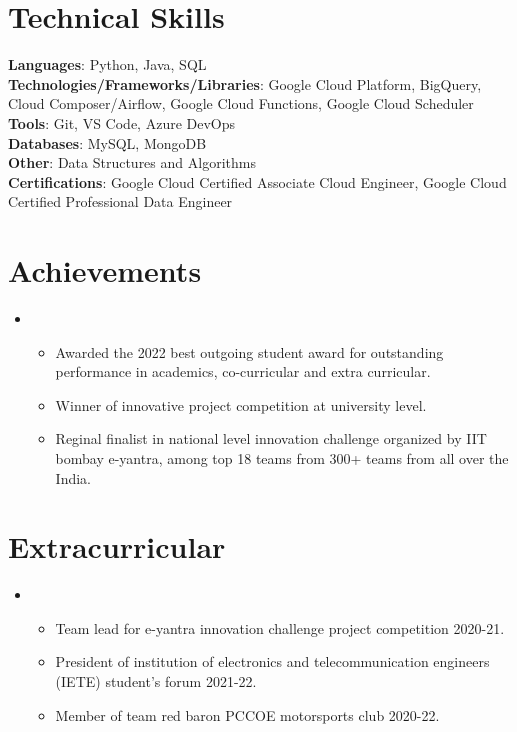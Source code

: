 \documentclass[letterpaper,11pt]{article}
\newcommand{\resumeItem}[1]{
  \item\small{
	{#1 \vspace{-2pt}}
  }
}
\newcommand{\resumeItemListStart}{\begin{itemize}}
\newcommand{\resumeItemListEnd}{\end{itemize}\vspace{-5pt}}
\begin{document}
\section{Technical Skills}
 \begin{itemize}[leftmargin=0.15in, label={}]
	\small{\item{
 	\textbf{Languages}{: Python, Java, SQL } \\
 	\textbf{Technologies/Frameworks/Libraries}{: Google Cloud Platform, BigQuery, Cloud Composer/Airflow, Google Cloud Functions, Google Cloud Scheduler } \\
 	\textbf{Tools}{: Git, VS Code, Azure DevOps } \\
 	\textbf{Databases}{: MySQL, MongoDB } \\
 	\textbf{Other}{: Data Structures and Algorithms } \\
  \textbf{Certifications}{: Google Cloud Certified Associate Cloud Engineer, Google Cloud Certified Professional Data Engineer} \\
	}}
 \end{itemize}
 \vspace{-16pt}


%
\section{Achievements}
\vspace{2pt}
 \begin{itemize}[leftmargin=0.15in, label={}]
 \item
	\resumeItemListStart
    	\resumeItem{Awarded the 2022 best outgoing student award for outstanding performance in academics, co-curricular and extra curricular.}
    	\resumeItem{Winner of innovative project competition at university level. }
    	\resumeItem{Reginal finalist in national level innovation challenge organized by IIT bombay e-yantra, among top 18 teams from 300+ teams from all over the India. }
  	\resumeItemListEnd
 \end{itemize}
 \vspace{-16pt}


%
\section{Extracurricular}
\vspace{2pt}
 \begin{itemize}[leftmargin=0.15in, label={}]
 \item
	\resumeItemListStart
    	\resumeItem {Team lead for e-yantra innovation challenge project competition 2020-21.}
    	\resumeItem {President of institution of electronics and telecommunication engineers (IETE) student's forum 2021-22.}
    	\resumeItem {Member of team red baron PCCOE motorsports club 2020-22.}
  	\resumeItemListEnd
 \end{itemize}
 \vspace{-16pt}
\end{document}
